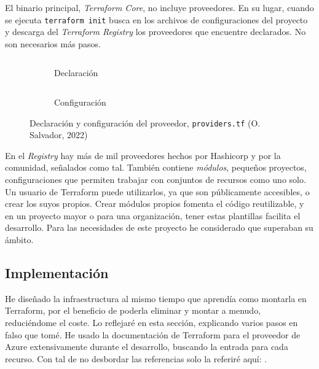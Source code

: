 \documentclass[11pt]{article}
\begin{document}
\begin{flushleft}
		
		El binario principal, \textit{Terraform Core}, no incluye proveedores. En su lugar, cuando se ejecuta \texttt{terraform init} busca en los archivos de configuraciones del proyecto y descarga del \textit{Terraform Registry} los proveedores que encuentre declarados. No son necesarios más pasos.
		\linebreak
		
		\begin{figure}[htb]
			\centering
			\begin{subfigure}{.35\linewidth}
				\inputminted[fontsize=\scriptsize, firstline=1, lastline=8, linenos, frame=single, breaklines]{javascript}{../../terraform/providers.tf}
				\caption{Declaración}
			\end{subfigure}
			\hspace{1.5cm}
			\begin{subfigure}{.4\linewidth}
				\inputminted[fontsize=\scriptsize, firstline=10, lastline=15, linenos, frame=single, breaklines]{javascript}{../../terraform/providers.tf}
				\vspace{.99cm}
				\caption{Configuración}
			\end{subfigure}
			\caption{Declaración y configuración del proveedor, \texttt{providers.tf} (O. Salvador, 2022)}
		\end{figure}
		
		En el \textit{Registry} hay más de mil proveedores hechos por Hashicorp y por la comunidad, señalados como tal. También contiene \textit{módulos}, pequeños proyectos, configuraciones que permiten trabajar con conjuntos de recursos como uno solo. Un usuario de Terraform puede utilizarlos, ya que son públicamente accesibles, o crear los suyos propios.	Crear módulos propios fomenta el código reutilizable, y en un proyecto mayor o para una organización, tener estas plantillas facilita el desarrollo. Para las necesidades de este proyecto he considerado que superaban su ámbito. 






	\clearpage
	\subsection{Implementación}
		He diseñado la infraestructura al mismo tiempo que aprendía como montarla en Terraform, por el beneficio de poderla eliminar y montar a menudo, reduciéndome el coste. Lo reflejaré en esta sección, explicando varios pasos en falso que tomé. He usado la documentación de Terraform para el proveedor de Azure extensivamente durante el desarrollo, buscando la entrada para cada recurso. Con tal de no desbordar las referencias solo la referiré aquí: \cite{azure_provider}.
	 \linebreak
	 

\end{flushleft}
\end{document}
